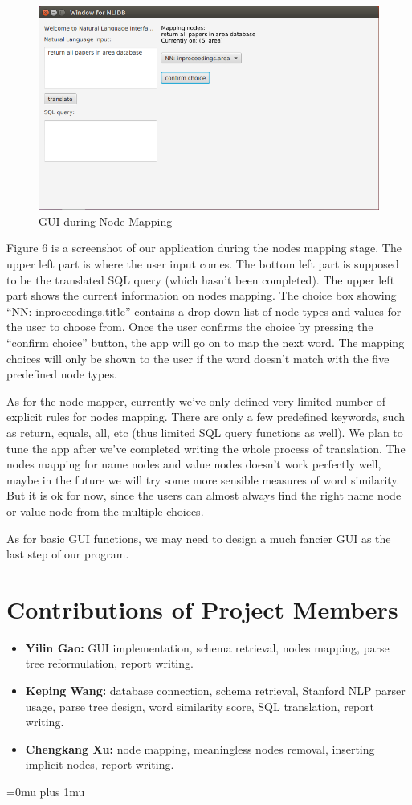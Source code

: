 \documentclass[twocolumn]{article}
\begin{document}
\begin{figure}[ht]
  \centering
  \includegraphics[width=0.7\linewidth]{figures/gui_nodes_mapping.png}
  \caption{GUI during Node Mapping}
\end{figure}

Figure 6 is a screenshot of our application during the nodes mapping stage. The upper left part is where the user input comes. The bottom left part is supposed to be the translated SQL query (which hasn’t been completed). The upper left part shows the current information on nodes mapping. The choice box showing “NN: inproceedings.title” contains a drop down list of node types and values for the user to choose from. Once the user confirms the choice by pressing the “confirm choice” button, the app will go on to map the next word. The mapping choices will only be shown to the user if the word doesn’t match with the five predefined node types.

As for the node mapper, currently we’ve only defined very limited number of explicit rules for nodes mapping. There are only a few predefined keywords, such as return, equals, all, etc (thus limited SQL query functions as well). We plan to tune the app after we’ve completed writing the whole process of translation. The nodes mapping for name nodes and value nodes doesn’t work perfectly well, maybe in the future we will try some more sensible measures of word similarity. But it is ok for now, since the users can almost always find the right name node or value node from the multiple choices. 

As for basic GUI functions, we may need to design a much fancier GUI as the last step of our program.

\section{Contributions of Project Members}

\begin{itemize}
\item {\bf Yilin Gao:} GUI implementation, schema retrieval, nodes mapping, parse tree reformulation, report writing.
\item {\bf Keping Wang:} database connection, schema retrieval, Stanford NLP parser usage, parse tree design, word similarity score, SQL translation, report writing.
\item {\bf Chengkang Xu:} node mapping, meaningless nodes removal, inserting implicit nodes, report writing.
\end{itemize}


\Urlmuskip=0mu plus 1mu\relax


\end{document}
